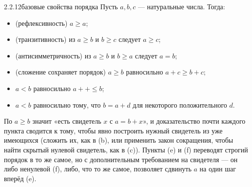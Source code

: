 \begin{proposition}{2.2.12}{базовые свойства порядка}
Пусть $a,b,c$ — натуральные числа. Тогда:
\begin{itemize}
  \item[(a)] (рефлексивность) $a \geq a$;
  \item[(b)] (транзитивность) из $a \geq b$ и $b \geq c$ следует $a \geq c$;
  \item[(c)] (антисимметричность) из $a \geq b$ и $b \geq a$ следует $a=b$;
  \item[(d)] (сложение сохраняет порядок) $a \geq b$ равносильно $a+c \geq b+c$;
  \item[(e)] $a<b$ равносильно $a{+}{+} \leq b$;
  \item[(f)] $a<b$ равносильно тому, что $b=a+d$ для некоторого положительного $d$.
\end{itemize}
\end{proposition}

\begin{intuition}
По  $a \geq b$ значит «есть свидетель $x$ с
$a=b+x$», и доказательство почти каждого пункта сводится к тому, чтобы явно построить
нужный свидетель из уже имеющихся (сложить их, как в (b), или применить закон
сокращения, чтобы найти скрытый нулевой свидетель, как в (c)). Пункты (e) и (f)
переводят строгий порядок в то же самое, но с дополнительным требованием на
свидетеля — он либо ненулевой (f), либо, что то же самое, позволяет сдвинуть $a$ на
один шаг вперёд (e).
\end{intuition}

